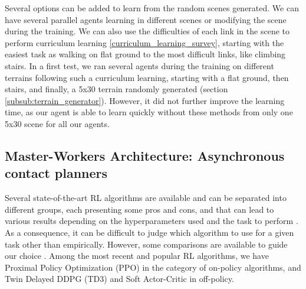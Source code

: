  Several options can be added to learn from the random scenes generated.
 We can have several parallel agents learning in different scenes or modifying the scene during the training.
 We can also use the difficulties of each link in the scene to perform curriculum learning \ref{curriculum_learning_survey}, starting with the easiest task as walking on flat ground to the most difficult links, like climbing stairs.
 In a first test, we ran several agents during the training on different terrains following such a curriculum learning, starting with a flat ground, then stairs, and finally, a 5x30 terrain randomly generated (section \ref{subsub:terrain_generator}). However, it did not further improve the learning time, as our agent is able to learn quickly without these methods from only one 5x30 scene for all our agents.
 
 
\subsection{Master-Workers Architecture: Asynchronous contact planners\label{subsub:leas:master_worker}}

Several state-of-the-art RL algorithms are available and can be separated into different groups, each presenting some pros and cons, and that can lead to various results depending on the hyperparameters used and the task to perform \cite{RL_that_matters, RL_that_matters_OnPolicy}. As a consequence, it can be difficult to judge which algorithm to use for a given task other than empirically. However, some comparisons are available to guide our choice \cite{compare_PPO_TD3_SAC_DDPG}.
Among the most recent and popular RL algorithms, we have Proximal Policy Optimization (PPO) \cite{PPO_2017} in the category of on-policy algorithms, and Twin Delayed DDPG (TD3) \cite{TD3_2018} and Soft Actor-Critic \cite{SAC_2018} in off-policy.

